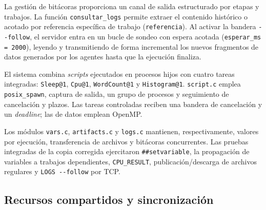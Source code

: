 \documentclass[12pt,a4paper]{article}
\newcommand{\code}[1]{\texttt{#1}}
\begin{document}
La gestión de bitácoras proporciona un canal de salida estructurado por etapas y trabajos. La función \code{consultar\_logs} permite extraer el contenido histórico o acotado por referencia específica de trabajo (\code{referencia}). Al activar la bandera \code{-{}-follow}, el servidor entra en un bucle de sondeo con espera acotada (\code{esperar\_ms = 2000}), leyendo y transmitiendo de forma incremental los nuevos fragmentos de datos generados por los agentes hasta que la ejecución finaliza.

El sistema combina \textit{scripts} ejecutados en procesos hijos con cuatro tareas integradas: \code{Sleep@1}, \code{Cpu@1}, \code{WordCount@1} y \code{Histogram@1}. \code{script.c} emplea \code{posix\_spawn}, captura de salida, un grupo de procesos y seguimiento de cancelación y plazos. Las tareas controladas reciben una bandera de cancelación y un \textit{deadline}; las de datos emplean OpenMP.

Los módulos \code{vars.c}, \code{artifacts.c} y \code{logs.c} mantienen, respectivamente, valores por ejecución, transferencia de archivos y bitácoras concurrentes. Las pruebas integradas de la copia corregida ejercitaron \code{\#\#setvariable}, la propagación de variables a trabajos dependientes, \code{CPU\_RESULT}, publicación/descarga de archivos regulares y \code{LOGS -{}-follow} por TCP.

\subsection{Recursos compartidos y sincronización}
\end{document}

